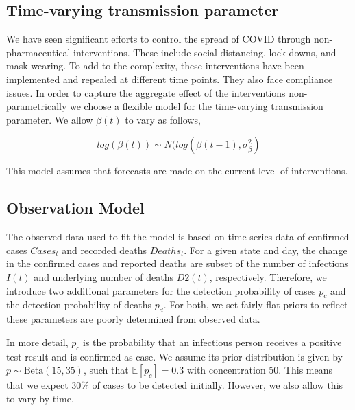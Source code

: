 \documentclass[11pt]{amsart}
\newcommand{\Beta}{\text{Beta}}
\newcommand{\E}{\mathbb{E}}
\begin{document}
 
 
 

 
 \subsection{Time-varying transmission parameter}
 
We have seen significant efforts to control the spread of COVID through non-pharmaceutical interventions. These include social distancing, lock-downs, and mask wearing. To add to the complexity, these interventions have been implemented and repealed at different time points. They also face compliance issues. In order to capture the aggregate effect of the interventions non-parametrically we choose a flexible model for the time-varying transmission parameter.
We allow $\beta(t)$ to vary as follows, 

$$log(\beta(t)) \sim N(log(\beta(t-1), \sigma_{\beta}^2)$$

This model assumes that forecasts are made on the current level of interventions. 


% 
 \subsection{Observation Model}
 
 The observed data used to fit the model is based on time-series data of confirmed cases $Cases_{t}$ and recorded deaths $Deaths_{t}$. 
For a given state and day, the change in the  confirmed cases and reported deaths are subset of the  number of infections $I(t)$ and underlying number of deaths $D2(t)$, respectively. Therefore, we introduce two additional parameters for the detection probability of cases $p_c$ and the detection probability of deaths $p_d$. For both, we set fairly flat priors to reflect these parameters are poorly determined from observed data.

In more detail, $p_c$ is the probability that an infectious person receives a positive test result and is confirmed as case. We assume its prior distribution is given by  $p \sim \Beta(15, 35)$, such that  $\E[p_c] = 0.3$ with concentration 50. This means that we expect 30\% of cases to be detected initially. However, we also allow this to vary by time.
\end{document}
